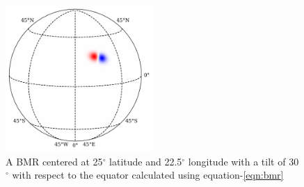 \begin{figure}
    \centering
    \includegraphics[width=0.5\textwidth]{example_bmr.png}
    \caption{A BMR centered at 25$^{\circ}$ latitude and 22.5$^{\circ}$ longitude with a tilt of 30$^{\circ}$ with respect to the equator calculated using equation-\ref{eqn:bmr}}
    \label{fig:example-bmr}
\end{figure}
